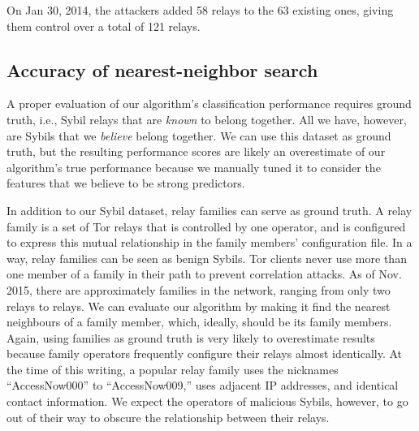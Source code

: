 
On Jan 30, 2014, the attackers added 58 relays to the 63 existing ones, giving
them control over a total of 121 relays.

% 

\subsection{Accuracy of nearest-neighbor search}
\label{sec:accuracy}
A proper evaluation of our algorithm's classification performance requires
ground truth, i.e., Sybil relays that are \emph{known} to belong together.  All
we have, however, are Sybils that we \emph{believe} belong together.  We can use
this dataset as ground truth, but the resulting performance scores are likely an
overestimate of our algorithm's true performance because we manually tuned it to
consider the features that we believe to be strong predictors.

In addition to our Sybil dataset, relay families can serve as ground truth.  A
relay family is a set of Tor relays that is controlled by one operator, and is
configured to express this mutual relationship in the family members'
configuration file.  In a way, relay families can be seen as benign Sybils.  Tor
clients never use more than one member of a family in their path to prevent
correlation attacks.  As of Nov.  2015, there are approximately 
families in the network, ranging from only two relays to  relays.
We can evaluate our algorithm by making it find the nearest neighbours of a
family member, which, ideally, should be its family members.  Again, using
families as ground truth is very likely to overestimate results because family
operators frequently configure their relays almost identically.  At the time of
this writing, a popular relay family uses the nicknames ``AccessNow000'' to
``AccessNow009,'' uses adjacent IP addresses, and identical contact information.
We expect the operators of malicious Sybils, however, to go out of their way to
obscure the relationship between their relays.

